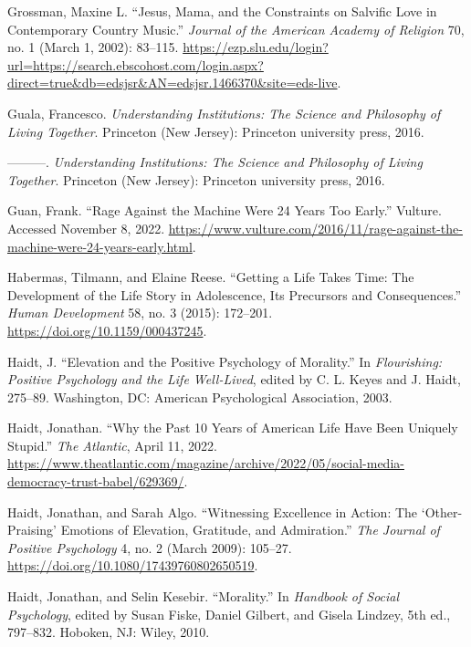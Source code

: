 \documentclass[phdthesis,12pt,final]{wuthesis}
\newlength{\cslhangindent}
\newenvironment{CSLReferences}[2] %
{\begin{list}{}{%
	\setlength{\itemindent}{0pt}
	\setlength{\leftmargin}{0pt}
	\setlength{\parsep}{0pt}
	\ifodd #1
	\setlength{\leftmargin}{\cslhangindent}
	\setlength{\itemindent}{-1\cslhangindent}
	\fi
	\setlength{\itemsep}{#2\baselineskip}}}
{\end{list}}
\theoremstyle{definition}
\theoremstyle{definition}
\theoremstyle{definition}
\theoremstyle{definition}
\theoremstyle{remark}
\begin{document}
\begin{CSLReferences}{1}{0}
Grossman, Maxine L. {``Jesus, {Mama}, and the {Constraints} on {Salvific Love} in {Contemporary Country Music}.''} \emph{Journal of the American Academy of Religion} 70, no. 1 (March 1, 2002): 83--115. \url{https://ezp.slu.edu/login?url=https://search.ebscohost.com/login.aspx?direct=true&db=edsjsr&AN=edsjsr.1466370&site=eds-live}.

Guala, Francesco. \emph{Understanding Institutions: The Science and Philosophy of Living Together}. Princeton (New Jersey): Princeton university press, 2016.

---------. \emph{Understanding {Institutions}: {The Science} and {Philosophy} of {Living Together}}. Princeton (New Jersey): Princeton university press, 2016.

Guan, Frank. {``Rage Against the Machine Were 24 Years Too Early.''} Vulture. Accessed November 8, 2022. \url{https://www.vulture.com/2016/11/rage-against-the-machine-were-24-years-early.html}.

Habermas, Tilmann, and Elaine Reese. {``Getting a Life Takes Time: The Development of the Life Story in Adolescence, Its Precursors and Consequences.''} \emph{Human Development} 58, no. 3 (2015): 172--201. \url{https://doi.org/10.1159/000437245}.

Haidt, J. {``Elevation and the Positive Psychology of Morality.''} In \emph{Flourishing: {Positive} Psychology and the Life Well-Lived}, edited by C. L. Keyes and J. Haidt, 275--89. Washington, DC: American Psychological Association, 2003.

Haidt, Jonathan. {``Why the {Past} 10 {Years} of {American Life Have Been Uniquely Stupid}.''} \emph{The Atlantic}, April 11, 2022. \url{https://www.theatlantic.com/magazine/archive/2022/05/social-media-democracy-trust-babel/629369/}.

Haidt, Jonathan, and Sarah Algo. {``Witnessing {Excellence} in {Action}: {The} {`{Other-Praising}'} {Emotions} of {Elevation}, {Gratitude}, and {Admiration}.''} \emph{The Journal of Positive Psychology} 4, no. 2 (March 2009): 105--27. \url{https://doi.org/10.1080/17439760802650519}.

Haidt, Jonathan, and Selin Kesebir. {``Morality.''} In \emph{Handbook of Social Psychology}, edited by Susan Fiske, Daniel Gilbert, and Gisela Lindzey, 5th ed., 797--832. Hoboken, NJ: Wiley, 2010.


\end{CSLReferences}
\end{document}
